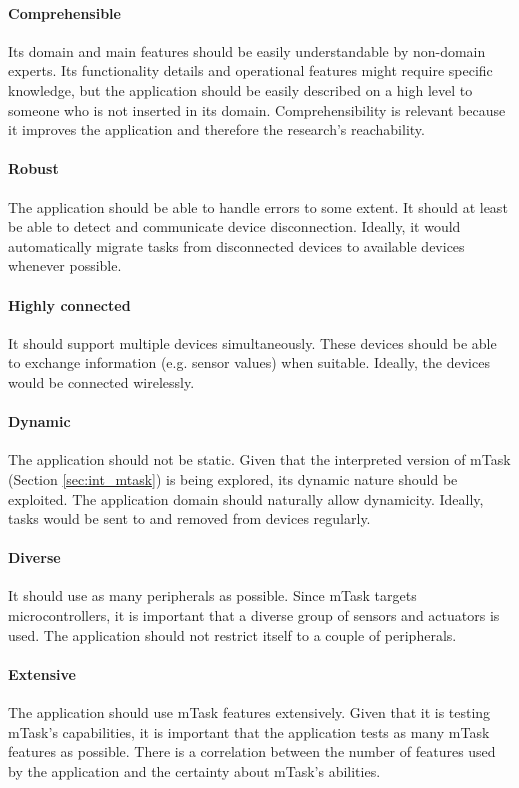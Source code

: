 \paragraph{Comprehensible} Its domain and main features should be easily understandable by non-domain experts. Its functionality details and operational features might require specific knowledge, but the application should be easily described on a high level to someone who is not inserted in its domain. Comprehensibility is relevant because it improves the application and therefore the research's reachability. 

\paragraph{Robust} The application should be able to handle errors to some extent. It should at least be able to detect and communicate device disconnection. Ideally, it would automatically migrate tasks from disconnected devices to available devices whenever possible. 

\paragraph{Highly connected} It should support multiple devices simultaneously. These devices should be able to exchange information (e.g. sensor values) when suitable. Ideally, the devices would be connected wirelessly.

\paragraph{Dynamic} The application should not be static. Given that the interpreted version of mTask (Section \ref{sec:int_mtask}) is being explored, its dynamic nature should be exploited. The application domain should naturally allow dynamicity. Ideally, tasks would be sent to and removed from devices regularly.

\paragraph{Diverse} It should use as many peripherals as possible. Since mTask targets microcontrollers, it is important that a diverse group of sensors and actuators is used. The application should not restrict itself to a couple of peripherals. 

\paragraph{Extensive} The application should use mTask features extensively. Given that it is testing mTask's capabilities, it is important that the application tests as many mTask features as possible. There is a correlation between the number of features used by the application and the certainty about mTask's abilities.

